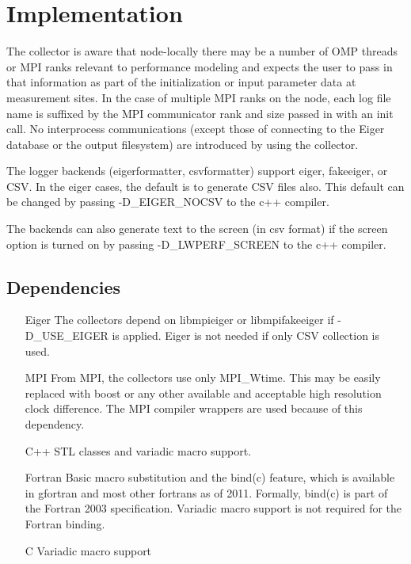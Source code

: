 
\chapter{Implementation}\label{sec:impl}
 The collector is aware that node-locally there may be a number of OMP threads or MPI ranks relevant to performance modeling and expects the user to pass in that information as part of the initialization or input parameter data at measurement sites. In the case of multiple MPI ranks on the node, each log file name is suffixed by the MPI communicator rank and size passed in with an init call. No interprocess communications (except those of connecting to the Eiger database or the output filesystem) are introduced by using the collector.

The logger backends (eigerformatter, csvformatter) support eiger, fakeeiger, or CSV. In the eiger cases, the default is to generate CSV files also. This default can be changed by passing -D\_EIGER\_NOCSV to the c++ compiler.

The backends can also generate text to the screen (in csv format) if the screen option is turned on by passing -D\_LWPERF\_SCREEN to the c++ compiler.


\section{Dependencies}
\begin{itemize}
\item[Eiger] The collectors depend on libmpieiger or libmpifakeeiger if -D\_USE\_EIGER is applied. Eiger is not needed if only CSV collection is used.
\item[MPI] From MPI, the collectors use only MPI\_Wtime. This may be easily replaced with boost or any other available and acceptable high resolution clock difference. The MPI compiler wrappers are used because of this dependency.
\item[C++] STL classes and variadic macro support.
\item[Fortran] Basic macro substitution and the bind(c) feature, which is available in gfortran and most other fortrans as of 2011. Formally, bind(c) is part of the Fortran 2003 specification. Variadic macro support is not required for the Fortran binding.
\item[C] Variadic macro support
\end{itemize}



